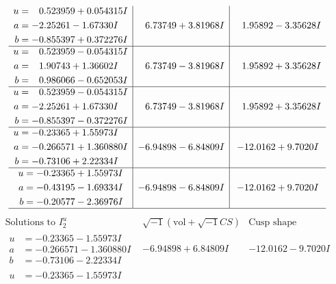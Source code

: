 \documentclass[1p]{elsarticle_modified}
\theoremstyle{definition}
\newcommand{\I}{\sqrt{-1}}
\begin{document}
$$\begin{array}{c|c|c}
\begin{aligned}
u &= \phantom{-}0.523959 + 0.054315 I \\
a &= -2.25261 - 1.67330 I \\
b &= -0.855397 + 0.372276 I\end{aligned}
 & \phantom{-}6.73749 + 3.81968 I & \phantom{-}1.95892 - 3.35628 I \\ \hline\begin{aligned}
u &= \phantom{-}0.523959 - 0.054315 I \\
a &= \phantom{-}1.90743 + 1.36602 I \\
b &= \phantom{-}0.986066 - 0.652053 I\end{aligned}
 & \phantom{-}6.73749 - 3.81968 I & \phantom{-}1.95892 + 3.35628 I \\ \hline\begin{aligned}
u &= \phantom{-}0.523959 - 0.054315 I \\
a &= -2.25261 + 1.67330 I \\
b &= -0.855397 - 0.372276 I\end{aligned}
 & \phantom{-}6.73749 - 3.81968 I & \phantom{-}1.95892 + 3.35628 I \\ \hline\begin{aligned}
u &= -0.23365 + 1.55973 I \\
a &= -0.266571 + 1.360880 I \\
b &= -0.73106 + 2.22334 I\end{aligned}
 & -6.94898 - 6.84809 I & -12.0162 + 9.7020 I \\ \hline\begin{aligned}
u &= -0.23365 + 1.55973 I \\
a &= -0.43195 - 1.69334 I \\
b &= -0.20577 - 2.36976 I\end{aligned}
 & -6.94898 - 6.84809 I & -12.0162 + 9.7020 I\\
 \hline 
 \end{array}$$\newpage$$\begin{array}{c|c|c}  
\text{Solutions to }I^u_{2}& \I (\text{vol} + \sqrt{-1}CS) & \text{Cusp shape}\\
 \hline 
\begin{aligned}
u &= -0.23365 - 1.55973 I \\
a &= -0.266571 - 1.360880 I \\
b &= -0.73106 - 2.22334 I\end{aligned}
 & -6.94898 + 6.84809 I & -12.0162 - 9.7020 I \\ \hline\begin{aligned}
u &= -0.23365 - 1.55973 I \\

\end{aligned}
\end{array}$$
\end{document}
